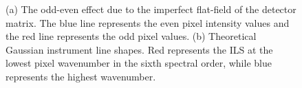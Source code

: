 \documentclass[5p]{elsarticle}
\begin{document}
\begin{figure}[t]
\begin{center}
\end{center}
\caption{(a) The odd-even effect due to the imperfect flat-field of the detector matrix. The blue line represents the even pixel intensity values and the red line represents the odd pixel values.  (b) Theoretical Gaussian instrument line shapes. Red represents the ILS at the lowest pixel wavenumber in the sixth spectral order, while blue represents the highest wavenumber.}
\end{figure}
\end{document}
